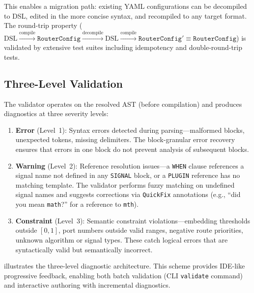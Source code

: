 This enables a migration path: existing YAML configurations can be decompiled to DSL, edited in the more concise syntax, and recompiled to any target format.
The round-trip property ($\text{DSL} \xrightarrow{\text{compile}} \texttt{RouterConfig} \xrightarrow{\text{decompile}} \text{DSL} \xrightarrow{\text{compile}} \texttt{RouterConfig}' \equiv \texttt{RouterConfig}$) is validated by extensive test suites including idempotency and double-round-trip tests.

\subsection{Three-Level Validation}
\label{sec:dsl_validation}

The validator operates on the resolved AST (before compilation) and produces diagnostics at three severity levels:

\begin{enumerate}
  \item \textbf{Error} (Level~1): Syntax errors detected during parsing---malformed blocks, unexpected tokens, missing delimiters. The block-granular error recovery ensures that errors in one block do not prevent analysis of subsequent blocks.
  \item \textbf{Warning} (Level~2): Reference resolution issues---a \texttt{WHEN} clause references a signal name not defined in any \texttt{SIGNAL} block, or a \texttt{PLUGIN} reference has no matching template. The validator performs fuzzy matching on undefined signal names and suggests corrections via \texttt{QuickFix} annotations (e.g., ``did you mean \texttt{math}?'' for a reference to \texttt{mth}).
  \item \textbf{Constraint} (Level~3): Semantic constraint violations---embedding thresholds outside $[0,1]$, port numbers outside valid ranges, negative route priorities, unknown algorithm or signal types. These catch logical errors that are syntactically valid but semantically incorrect.
\end{enumerate}

 illustrates the three-level diagnostic architecture.
This scheme provides IDE-like progressive feedback, enabling both batch validation (CLI \texttt{validate} command) and interactive authoring with incremental diagnostics.

